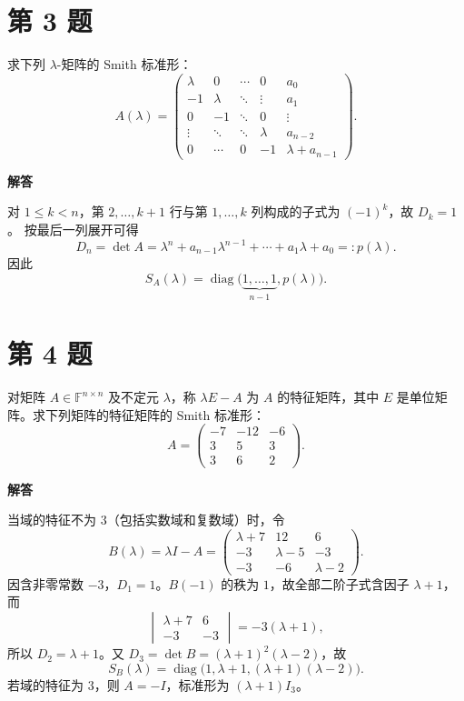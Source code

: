 \documentclass[UTF8,10pt,letterpaper,fontset=fandol]{ctexart}
\newcommand{\F}{\mathbb F}
\newcommand{\Solution}{\par\Needspace{4\baselineskip}\textbf{解答}\par}
\begin{document}
\section{第 3 题}
求下列 $\lambda$-矩阵的 Smith 标准形：
\[
A(\lambda)=\begin{pmatrix}
\lambda&0&\cdots&0&a_0\\
-1&\lambda&\ddots&\vdots&a_1\\
0&-1&\ddots&0&\vdots\\
\vdots&\ddots&\ddots&\lambda&a_{n-2}\\
0&\cdots&0&-1&\lambda+a_{n-1}
\end{pmatrix}.
\]
\Solution
对 $1\le k<n$，第 $2,\ldots,k+1$ 行与第 $1,\ldots,k$ 列构成的子式为 $(-1)^k$，故 $D_k=1$。
按最后一列展开可得
\[
D_n=\det A=\lambda^n+a_{n-1}\lambda^{n-1}+\cdots+a_1\lambda+a_0=:p(\lambda).
\]
因此
\[
\boxed{S_A(\lambda)=\operatorname{diag}\bigl(\underbrace{1,\ldots,1}_{n-1},p(\lambda)\bigr)}.
\]

\section{第 4 题}
对矩阵 $A\in\F^{n\times n}$ 及不定元 $\lambda$，称 $\lambda E-A$ 为 $A$ 的特征矩阵，其中 $E$ 是单位矩阵。求下列矩阵的特征矩阵的 Smith 标准形：
\[
A=\begin{pmatrix}-7&-12&-6\\3&5&3\\3&6&2\end{pmatrix}.
\]
\Solution
当域的特征不为 $3$（包括实数域和复数域）时，令
\[
B(\lambda)=\lambda I-A=\begin{pmatrix}
\lambda+7&12&6\\-3&\lambda-5&-3\\-3&-6&\lambda-2
\end{pmatrix}.
\]
因含非零常数 $-3$，$D_1=1$。$B(-1)$ 的秩为 $1$，故全部二阶子式含因子 $\lambda+1$，而
\[
\begin{vmatrix}\lambda+7&6\\-3&-3\end{vmatrix}=-3(\lambda+1),
\]
所以 $D_2=\lambda+1$。又 $D_3=\det B=(\lambda+1)^2(\lambda-2)$，故
\[
\boxed{S_B(\lambda)=\operatorname{diag}\bigl(1,\lambda+1,(\lambda+1)(\lambda-2)\bigr)}.
\]
若域的特征为 $3$，则 $A=-I$，标准形为 $\boxed{(\lambda+1)I_3}$。
\end{document}
